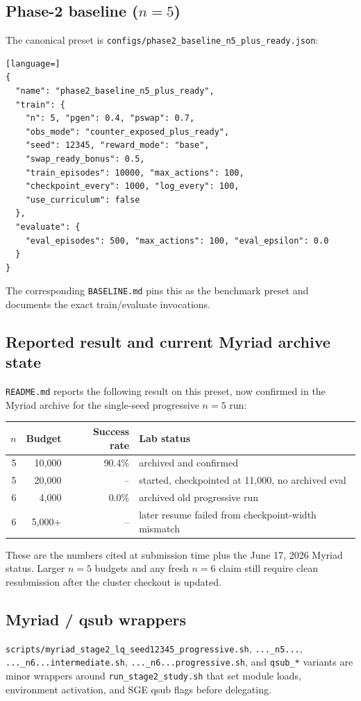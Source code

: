 \documentclass[11pt]{article}
\newcommand{\code}[1]{\texttt{#1}}
\newcommand{\file}[1]{\texttt{\small #1}}
\begin{document}
\subsection{Phase-2 baseline ($n=5$)}
The canonical preset is \file{configs/phase2\_baseline\_n5\_plus\_ready.json}:
\begin{lstlisting}[language=]
{
  "name": "phase2_baseline_n5_plus_ready",
  "train": {
    "n": 5, "pgen": 0.4, "pswap": 0.7,
    "obs_mode": "counter_exposed_plus_ready",
    "seed": 12345, "reward_mode": "base",
    "swap_ready_bonus": 0.5,
    "train_episodes": 10000, "max_actions": 100,
    "checkpoint_every": 1000, "log_every": 100,
    "use_curriculum": false
  },
  "evaluate": {
    "eval_episodes": 500, "max_actions": 100, "eval_epsilon": 0.0
  }
}
\end{lstlisting}
The corresponding \file{BASELINE.md} pins this as the benchmark preset and documents the exact train/evaluate invocations.

\subsection{Reported result and current Myriad archive state}
\code{README.md} reports the following result on this preset, now confirmed in
the Myriad archive for the single-seed progressive $n=5$ run:
\begin{center}
\begin{tabular}{rrrl}
\toprule
$n$ & Budget & Success rate & Lab status \\
\midrule
5 & 10{,}000 & 90.4\% & archived and confirmed \\
5 & 20{,}000 & -- & started, checkpointed at 11{,}000, no archived eval \\
6 & 4{,}000 & 0.0\% & archived old progressive run \\
6 & 5{,}000+ & -- & later resume failed from checkpoint-width mismatch \\
\bottomrule
\end{tabular}
\end{center}
These are the numbers cited at submission time plus the June 17, 2026 Myriad
status. Larger $n=5$ budgets and any fresh $n=6$ claim still require clean
resubmission after the cluster checkout is updated.

\subsection{Myriad / qsub wrappers}
\file{scripts/myriad\_stage2\_lq\_seed12345\_progressive.sh}, \file{...\_n5...}, \file{...\_n6...intermediate.sh}, \file{...\_n6...progressive.sh}, and \code{qsub\_*} variants are minor wrappers around \file{run\_stage2\_study.sh} that set module loads, environment activation, and SGE qsub flags before delegating.
\end{document}
